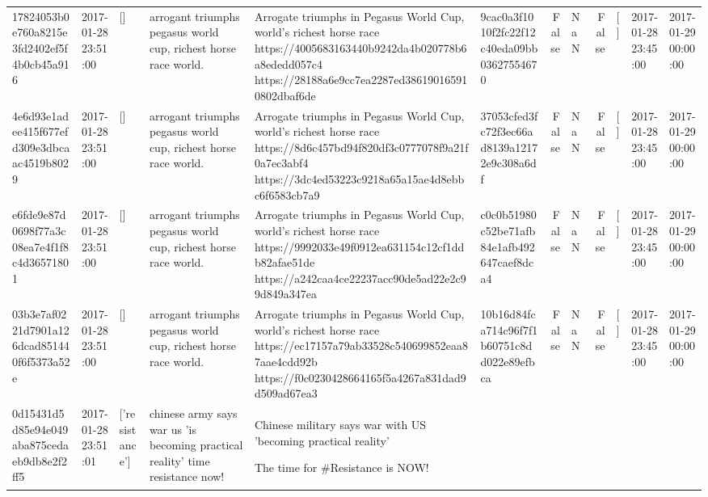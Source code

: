 \begin{tabular}{llllllrlrlll}
17824053b0e760a8215e3fd2402ef5f4b0cb45a916 & 2017-01-28 23:51:00 & [] & arrogant triumphs pegasus world cup, richest horse race world. & Arrogate triumphs in Pegasus World Cup, world's richest horse race https://4005683163440b9242da4b020778b6a8ededd057c4 https://28188a6e9cc7ea2287ed386190165910802dbaf6de & 9cac0a3f1010f2fc22f12c40eda09bb03627554670 & False & NaN & False & [] & 2017-01-28 23:45:00 & 2017-01-29 00:00:00 \\
4e6d93e1adee415f677efd309e3dbcaac4519b8029 & 2017-01-28 23:51:00 & [] & arrogant triumphs pegasus world cup, richest horse race world. & Arrogate triumphs in Pegasus World Cup, world's richest horse race https://8d6c457bd94f820df3c0777078f9a21f0a7ec3abf4 https://3dc4ed53223c9218a65a15ae4d8ebbc6f6583cb7a9 & 37053cfed3fc72f3ec66ad8139a12172e9c308a6df & False & NaN & False & [] & 2017-01-28 23:45:00 & 2017-01-29 00:00:00 \\
e6fde9e87d0698f77a3c08ea7e4f1f8c4d36571801 & 2017-01-28 23:51:00 & [] & arrogant triumphs pegasus world cup, richest horse race world. & Arrogate triumphs in Pegasus World Cup, world's richest horse race https://9992033e49f0912ea631154c12cf1ddb82afae51de https://a242caa4ce22237acc90de5ad22e2c99d849a347ea & c0c0b51980c52be71afb84e1afb492647caef8dca4 & False & NaN & False & [] & 2017-01-28 23:45:00 & 2017-01-29 00:00:00 \\
03b3e7af0221d7901a126dcad851440f6f5373a52e & 2017-01-28 23:51:00 & [] & arrogant triumphs pegasus world cup, richest horse race world. & Arrogate triumphs in Pegasus World Cup, world's richest horse race https://ec17157a79ab33528c540699852eaa87aae4cdd92b https://f0c0230428664165f5a4267a831dad9d509ad67ea3 & 10b16d84fca714c96f7f1b60751c8dd022e89efbca & False & NaN & False & [] & 2017-01-28 23:45:00 & 2017-01-29 00:00:00 \\
0d15431d5d85e94e049aba875cedaeb9db8e2f2ff5 & 2017-01-28 23:51:01 & ['resistance'] & chinese army says war us 'is becoming practical reality' time resistance now! & Chinese military says war with US 'becoming practical reality' 

The time for \#Resistance is NOW!  ✊🏻


\end{tabular}
